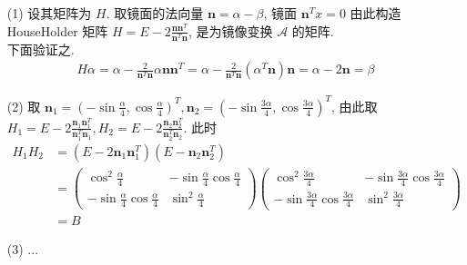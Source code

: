 \documentclass{article}
\newcommand{\bn}{\boldsymbol{n}}
\begin{document}
\begin{itemize}
    \item [(1)] 设其矩阵为 $H$. 取镜面的法向量 $\boldsymbol{n} = \alpha - \beta$, 镜面 $\boldsymbol{n}^Tx = 0$ 由此构造 HouseHolder 矩阵 $H = E - 2\frac{\bn\bn^T}{\bn^T\bn}$, 是为镜像变换 $\mathcal{A}$ 的矩阵. \\
    下面验证之. \\
    \begin{align*}
        H\alpha = \alpha - \frac{2}{\bn^T\bn}\alpha\bn\bn^T = \alpha - \frac{2}{\bn^T\bn}(\alpha^T\bn) \bn = \alpha - 2\bn = \beta
    \end{align*}
    \item [(2)] 取 $\bn_1 = \left(-\sin \frac{\alpha}{4}, \cos \frac{\alpha}{4}\right)^T, \bn_2 = \left(-\sin \frac{3\alpha}{4}, \cos \frac{3\alpha}{4}\right)^T$, 由此取 $H_1 = E - 2\frac{\bn_1\bn_1^T}{\bn_1^T\bn_1}, H_2 = E - 2\frac{\bn_2\bn_2^T}{\bn_2^T\bn_2}$. 此时
    \begin{align*}
        H_1H_2 &= \left(E - 2\bn_1\bn_1^T\right)\left(E - \bn_2\bn_2^T\right) \\
        &= \begin{pmatrix}
            \cos^2 \frac{\alpha}{4} & -\sin \frac{\alpha}{4} \cos \frac{\alpha}{4} \\
            -\sin \frac{\alpha}{4} \cos \frac{\alpha}{4} & \sin^2 \frac{\alpha}{4}
        \end{pmatrix}
        \begin{pmatrix}
            \cos^2 \frac{3\alpha}{4} & -\sin \frac{3\alpha}{4} \cos \frac{3\alpha}{4} \\
            -\sin \frac{3\alpha}{4} \cos \frac{3\alpha}{4} & \sin^2 \frac{3\alpha}{4}
        \end{pmatrix} \\
        &= B
    \end{align*}
    \item [(3)] ...
\end{itemize}

\section{}
\end{document}

